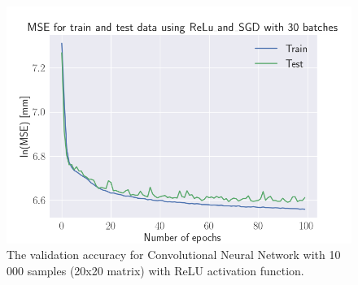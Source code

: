 \documentclass[a4paper, UKenglish, 11pt]{uiomaster}
\begin{document}
\begin{figure}[!htb]
    \centering
    \includegraphics[width=\linewidth]{../Code/plots/finals/MSE_CNN_dipoles_2_interpolated_CNN_20x20_10000_ReLu_and_SGD_30_100.png}
    \caption{The validation accuracy for Convolutional Neural Network with 10 000 samples (20x20 matrix) with ReLU activation function. }
    \label{fig:single_dipole_accuracy_CNN_2d}
\end{figure}

\end{document}
